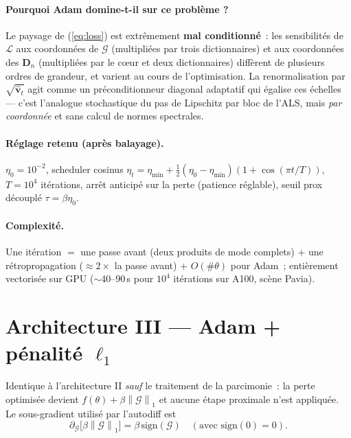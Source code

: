 \documentclass[11pt,a4paper]{article}
\newcommand{\T}[1]{\bm{\mathcal{#1}}}          %
\newcommand{\M}[1]{\bm{#1}}                     %
\newcommand{\noru}[1]{\left\lVert #1 \right\rVert_1}
\begin{document}
\paragraph{Pourquoi Adam domine-t-il sur ce problème ?}
Le paysage de (\ref{eq:loss}) est extrêmement \textbf{mal conditionné}~: les
sensibilités de $\mathcal{L}$ aux coordonnées de $\T{G}$ (multipliées par
trois dictionnaires) et aux coordonnées des $\M{D}_n$ (multipliées par le
c\oe ur et deux dictionnaires) diffèrent de plusieurs ordres de grandeur, et
varient au cours de l'optimisation. La renormalisation par
$\sqrt{\hat{\M{v}}_t}$ agit comme un préconditionneur diagonal adaptatif qui
égalise ces échelles — c'est l'analogue stochastique du pas de Lipschitz par
bloc de l'ALS, mais \emph{par coordonnée} et sans calcul de normes
spectrales.

\paragraph{Réglage retenu (après balayage).} $\eta_0=10^{-2}$, scheduler
cosinus $\eta_t = \eta_{\min} + \tfrac12(\eta_0-\eta_{\min})
(1+\cos(\pi t/T))$, $T=10^4$ itérations, arrêt anticipé sur la perte
(patience réglable), seuil prox découplé $\tau=\beta\eta_0$.

\paragraph{Complexité.} Une itération $=$ une passe avant (deux produits de
mode complets) $+$ une rétropropagation ($\approx 2\times$ la passe avant)
$+$ $O(\#\theta)$ pour Adam~; entièrement vectorisée sur GPU
($\sim$40--90\,s pour $10^4$ itérations sur A100, scène Pavia).

\section{Architecture III --- Adam + pénalité $\ell_1$}
\label{sec:adaml1}

Identique à l'architecture II \emph{sauf} le traitement de la parcimonie~:
la perte optimisée devient $f(\theta)+\beta\noru{\T{G}}$ et aucune étape
proximale n'est appliquée. Le sous-gradient utilisé par l'autodiff est
\begin{equation}
  \partial_{\T{G}}\bigl[\beta\noru{\T{G}}\bigr]
  = \beta\,\mathrm{sign}(\T{G})
  \quad(\text{avec } \mathrm{sign}(0)=0).
\end{equation}
\end{document}
